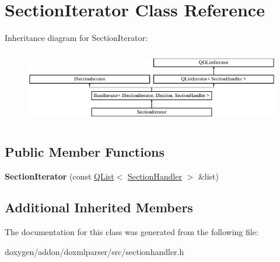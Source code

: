 \hypertarget{class_section_iterator}{}\section{Section\+Iterator Class Reference}
\label{class_section_iterator}
Inheritance diagram for Section\+Iterator\+:\begin{figure}[H]
\begin{center}
\leavevmode
\includegraphics[height=3.227666cm]{class_section_iterator}
\end{center}
\end{figure}
\subsection*{Public Member Functions}
\begin{DoxyCompactItemize}
\item 
\mbox{\label{class_section_iterator_af8516c892a7b1d6e2faee41ad51d77ba}} 
{\bfseries Section\+Iterator} (const \mbox{\hyperlink{class_q_list}{Q\+List}}$<$ \mbox{\hyperlink{class_section_handler}{Section\+Handler}} $>$ \&list)
\end{DoxyCompactItemize}
\subsection*{Additional Inherited Members}


The documentation for this class was generated from the following file\+:\begin{DoxyCompactItemize}
\item 
doxygen/addon/doxmlparser/src/sectionhandler.\+h\end{DoxyCompactItemize}
